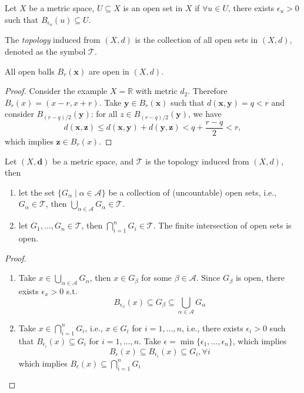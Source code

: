 \begin{definition}
Let $X$ be a metric space, $U\subseteq X$ is an open set in $X$ if $\forall u\in U$, there exists $\epsilon_u>0$ such that $B_{\epsilon_u}(u)\subseteq U$.
\end{definition}
\begin{definition}
The \emph{topology} induced from $(X,d)$ is the collection of all open sets in $(X,d)$, denoted as the symbol $\mathcal{T}$.
\end{definition}
\begin{proposition}
All open balls $B_r(\bm x)$ are open in $(X,d)$.
\end{proposition}
\begin{proof}
Consider the example $X=\mathbb{R}$ with metric $d_2$. Therefore $B_r(x)=(x-r,x+r)$. Take $\bm y\in B_r(\bm x)$ such that $d(\bm x,\bm y)=q<r$ and consider $B_{(r-q)/2}(\bm y)$: for all $z\in B_{(r-q)/2}(\bm y)$, we have
\[
d(\bm x,\bm z)\le d(\bm x,\bm y)+d(\bm y,\bm z)<q+\frac{r-q}{2}<r,
\]
which implies $\bm z\in B_r(x)$.
\end{proof}

\begin{proposition}\label{Pro:1:6}
Let $(X,\bm d)$ be a metric space, and $\mathcal{T}$ is the topology induced from $(X,d)$, then
\begin{enumerate}
\item
let the set $\{G_\alpha\mid\alpha\in\mathcal{A}\}$ be a collection of (uncountable) open sets, i.e., $G_\alpha\in\mathcal{T}$, then $\bigcup_{\alpha\in\mathcal{A}}G_\alpha\in\mathcal{T}$.
\item
let $G_1,\dots,G_n\in\mathcal{T}$, then $\bigcap_{i=1}^nG_i\in\mathcal{T}$. The finite intersection of open sets is open.
\end{enumerate}
\end{proposition}
\begin{proof}
\begin{enumerate}
\item
Take $x\in\bigcup_{\alpha\in\mathcal{A}}G_\alpha$, 
then $x\in G_\beta$ for some $\beta\in\mathcal{A}$. 
Since $G_\beta$ is open, there exists $\epsilon_x>0$ s.t.
\[
B_{\epsilon_x}(x)\subseteq G_\beta\subseteq\bigcup_{\alpha\in\mathcal{A}}G_\alpha
\]
\item
Take $x\in\bigcap_{i=1}^nG_i$, i.e., $x\in G_i$ for $i=1,\dots,n$, i.e., there exists $\epsilon_i>0$ such that $B_{\epsilon_i}(x)\subseteq G_i$ for $i=1,\dots,n$. Take $\epsilon=\min\{\epsilon_1,\dots,\epsilon_n\}$, which implies
\[
B_\epsilon(x)\subseteq B_{\epsilon_i}(x)\subseteq G_i,\forall i
\]
which implies $B_\epsilon(x)\subseteq\bigcap_{i=1}^nG_i$
\end{enumerate}
\end{proof}
